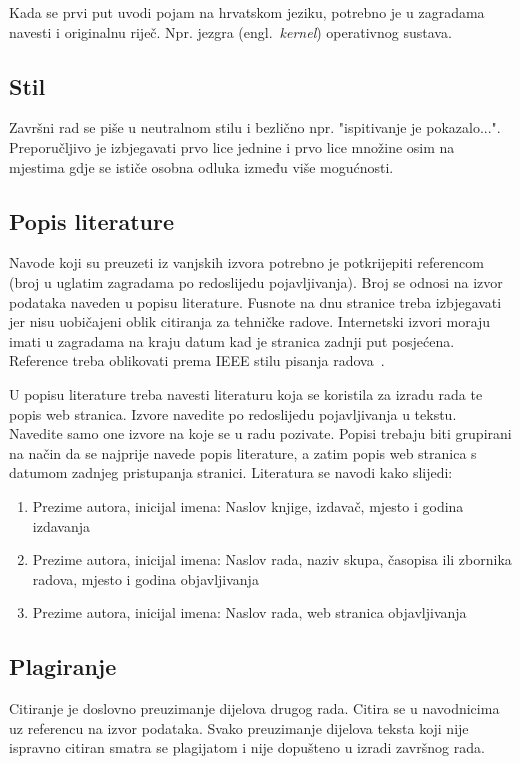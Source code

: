 Kada se prvi put uvodi pojam na hrvatskom jeziku, potrebno je u zagradama navesti i originalnu riječ. Npr. jezgra (engl.~\textit{kernel}) operativnog sustava.  

\subsection{Stil}
Završni rad se piše u neutralnom stilu i bezlično npr. "ispitivanje je pokazalo...". 
Preporučljivo je izbjegavati prvo lice jednine i prvo lice množine osim na mjestima gdje se ističe osobna odluka između više mogućnosti. 


\subsection{Popis literature}
Navode koji su preuzeti iz vanjskih izvora potrebno je potkrijepiti referencom (broj u uglatim zagradama po redoslijedu pojavljivanja). Broj se odnosi na izvor podataka naveden u popisu literature. Fusnote na dnu stranice treba izbjegavati jer nisu uobičajeni oblik citiranja za tehničke radove. Internetski izvori moraju imati u zagradama na kraju datum kad je stranica zadnji put posjećena. Reference treba oblikovati prema IEEE stilu pisanja radova~\cite{IEEE}.

U popisu literature treba navesti literaturu koja se koristila za izradu rada te popis web stranica. Izvore navedite po redoslijedu pojavljivanja u tekstu. Navedite samo one izvore na koje se u radu pozivate. Popisi trebaju biti 
grupirani na način da se najprije navede popis literature, a zatim popis web stranica s datumom zadnjeg pristupanja stranici. Literatura se navodi kako slijedi:
\begin{enumerate}
\item 
Prezime autora, inicijal imena: Naslov knjige, izdavač, mjesto i godina izdavanja
\item Prezime autora, inicijal imena: Naslov rada, naziv skupa, časopisa ili zbornika radova,
mjesto i godina objavljivanja
\item Prezime autora, inicijal imena: Naslov rada, web stranica objavljivanja
\end{enumerate}

\subsection{Plagiranje}

Citiranje je doslovno preuzimanje dijelova drugog rada. Citira se u navodnicima uz referencu na izvor podataka. 
Svako preuzimanje dijelova teksta koji nije ispravno citiran smatra se plagijatom i nije dopušteno u izradi završnog rada.

